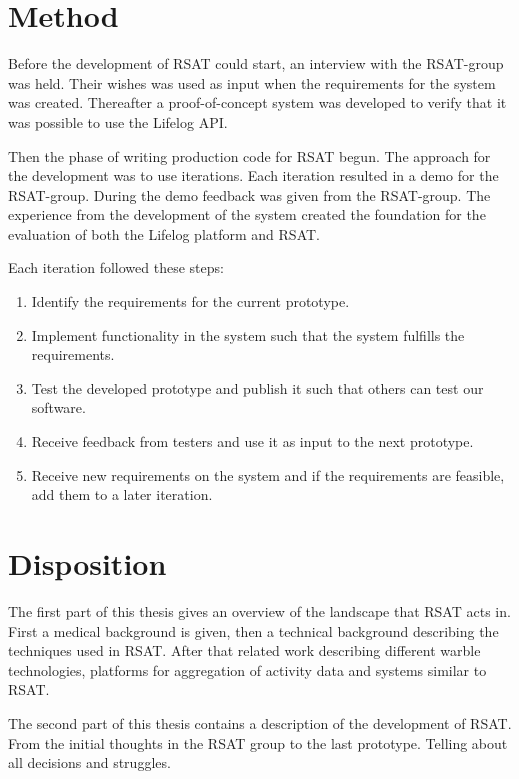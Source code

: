 \documentclass{cslthse-msc}
\begin{document}
\section{Method}
Before the development of RSAT could start, an interview with the RSAT-group was held. Their wishes was used as input when the requirements for the system was created. Thereafter a proof-of-concept system was developed to verify that it was possible to use the Lifelog API.

Then the phase of writing production code for RSAT begun. The approach for the development was to use iterations. Each iteration resulted in a demo for the RSAT-group. During the demo feedback was given from the RSAT-group. The experience from the development of the system created the foundation for the evaluation of both the Lifelog platform and RSAT.

Each iteration followed these steps: 

\begin{enumerate}
\item Identify the requirements for the current prototype.
\item Implement functionality in the system such that the system fulfills the requirements.
\item Test the developed prototype and publish it such that others can test our software.
\item Receive feedback from testers and use it as input to the next prototype. 
\item Receive new requirements on the system and if the requirements are feasible, add them to a later iteration. 
\end{enumerate}



\section{Disposition}

The first part of this thesis gives an overview of the landscape that RSAT acts in. First a medical background is given, then a technical background describing the techniques used in RSAT. After that related work describing  different warble technologies, platforms for aggregation of activity data and  systems similar to RSAT. 

The second part of this thesis contains a description of the development of RSAT. From the initial thoughts in the RSAT group to the last prototype. Telling about all decisions and struggles.  
\end{document}
